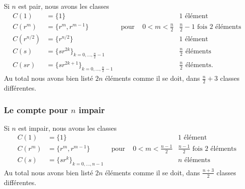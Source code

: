 Si \( n\) est pair, nous avons les classes
\begin{subequations}
	\begin{align}
		C(1)       & =\{ 1 \}                                       &               &                   & 1\text{ élément}                               \\
		C(r^m)     & =\{ r^m,r^{m-1} \}                             & \text{ pour } & 0<m<\frac{ n }{2} & \frac{ n }{2}-1\text{ fois } 2\text{ éléments} \\
		C(r^{n/2}) & =\{ r^{n/2} \}                                 &               &                   & 1\text{ élément}                               \\
		C(s)       & =\{ sr^{2k} \}_{k=0,\ldots, \frac{ n }{2}-1}   &               &                   & \frac{ n }{2}\text{ éléments}                  \\
		C(sr)      & =\{ sr^{2k+1} \}_{k=0,\ldots, \frac{ n }{2}-1} &               &                   & \frac{ n }{2}\text{ éléments}.
	\end{align}
\end{subequations}
Au total nous avons bien listé \( 2n\) éléments comme il se doit, dans \(  \frac{ n }{2}+3\) classes différentes.

\subsubsection{Le compte pour \(  n\) impair}
\label{GJIzDEP}

Si \( n\) est impair, nous avons les classes
\begin{subequations}
	\begin{align}
		C(1)   & =\{ 1 \}                      &               &                     & 1\text{ élément}                               \\
		C(r^m) & =\{ r^m,r^{m-1} \}            & \text{ pour } & 0<m<\frac{ n-1 }{2} & \frac{ n-1 }{2}\text{ fois } 2\text{ éléments} \\
		C(s)   & =\{ sr^k \}_{k=0,\ldots, n-1} &               &                     & n\text{ éléments}
	\end{align}
\end{subequations}
Au total nous avons bien listé \( 2n\) éléments comme il se doit, dans \(  \frac{ n+3 }{2}\) classes différentes.

